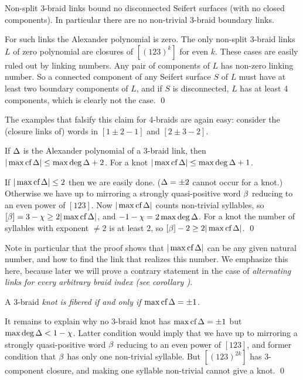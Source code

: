 \begin{corr}\label{cbd}
Non-split 3-braid links bound no disconnected Seifert surfaces (with
no closed components). In particular there are no non-trivial 3-braid
boundary links.
\end{corr}

\proof For such links the Alexander polynomial is zero. The only
non-split 3-braid links $L$ of zero polynomial are closures of
$[(123)^k]$ for even $k$. These cases are easily ruled out by linking
numbers. Any pair of components of $L$ has non-zero linking number.
So a connected component of any Seifert surface $S$ of $L$ must have
at least two boundary components of $L$, and if $S$ is disconnected,
$L$ has at least 4 components, which is clearly not the case. \qed

The examples that falsify this claim for 4-braids are again
easy: consider the (closure links of) words in $[1\pm 2-1]$ and
$[2\pm 3-2]$.

\begin{corr}
If $\Delta$ is the Alexander polynomial of a 3-braid link, then
$|\max\text{\rm cf}\,\Delta|\le \max\deg\Delta+2$. For a knot $|\max\text{\rm cf}\,\Delta|\le\max\deg\Delta+1$.
\end{corr}

\proof If $|\max\text{\rm cf}\,\Delta|\le 2$ then we are easily done. 
($\Delta=\pm 2$ cannot occur for a knot.) Otherwise we have
up to mirroring a strongly quasi-positive word $\beta$ reducing to
an even power of $[123]$. Now $|\max\text{\rm cf}\,\Delta|$ counts non-trivial syllables,
so $[\beta]=3-\chi\ge 2|\max\text{\rm cf}\,\Delta|$, and $-1-\chi=2\max\deg\Delta$. For a knot
the number of syllables with exponent $\ne 2$ is at least $2$,
so $[\beta]-2\ge 2|\max\text{\rm cf}\,\Delta|$. \qed

Note in particular that the proof shows that $|\max\text{\rm cf}\,\Delta|$
can be any given natural number, and how to find the link
that realizes this number. We emphasize this here, because
later we will prove a contrary statement in the case of
\em{alternating} links for \em{every} arbitrary braid index
(see corollary ).

\begin{corr}
A 3-braid \em{knot} is fibered if and only if $\max\text{\rm cf}\,\Delta=\pm 1$.
\end{corr}

\proof It remains to explain why no 3-braid knot has $\max\text{\rm cf}\,\Delta=\pm 1$
but $\max\deg\Delta<1-\chi$. Latter condition would imply that we have
up to mirroring a strongly quasi-positive word $\beta$ reducing to
an even power of $[123]$, and former condition that $\beta$ has only one
non-trivial syllable. But $[(123)^{2k}]$ has 3-component closure,
and making one syllable non-trivial cannot give a knot. \qed

